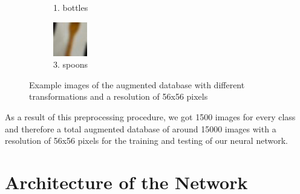 \documentclass{tubaf-article}
\begin{document}
\begin{figure}[h!]
\begin{subfigure}[b]{0.3\textwidth}
			\caption{1. bottles}
			\label{fig:bild2}
		\end{subfigure}
		\hfill
		\begin{subfigure}[b]{0.3\textwidth}
			\centering
			\includegraphics[width=\textwidth]{3435_1.jpeg}
			\caption{3. spoons}
			\label{fig:bild2}
		\end{subfigure}
		\hfill
		\caption{Example images of the augmented database with different transformations and a resolution of 56x56 pixels}
		\label{fig:nebeneinander}
	\end{figure}
	As a result of this preprocessing procedure, we got 1500 images for every class and therefore a total augmented database of around 15000 images with a resolution of 56x56 pixels for the training and testing of our neural network. 
	
	
	\section{Architecture of the Network}
	\label{architecture}
	
\end{document}
